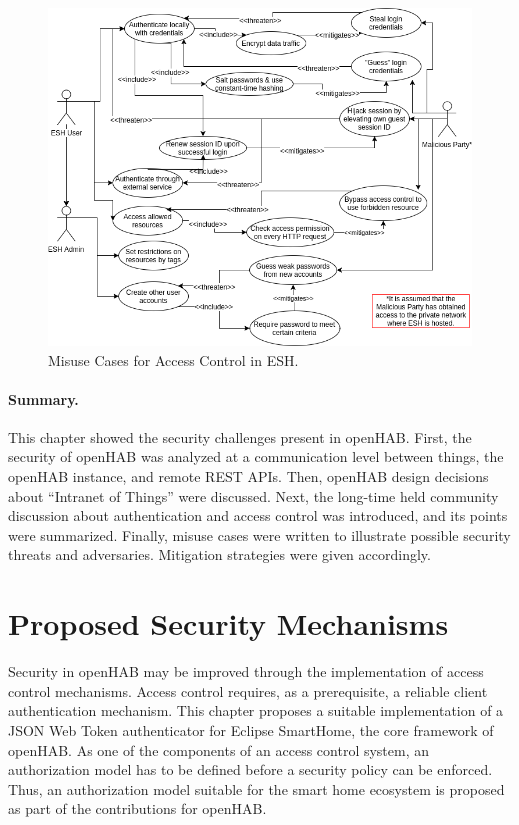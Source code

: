 \documentclass[12pt]{article}
\begin{document}
\begin{figure} [ht] 
\begin{center}
\includegraphics[width=\textwidth]{esh_misuse_cases}
\caption{Misuse Cases for Access Control in ESH.}
\label{fig:misuse_cases}
\end{center}
\end{figure}

\paragraph{Summary.} This chapter showed the security challenges present in openHAB. First, the security of openHAB was analyzed at a communication level between things, the openHAB instance, and remote REST APIs. Then, openHAB design decisions about ``Intranet of Things'' were discussed. Next, the long-time held community discussion about authentication and access control was introduced, and its points were summarized. Finally, misuse cases were written to illustrate possible security threats and adversaries. Mitigation strategies were given accordingly. 

\newpage
\section{Proposed Security Mechanisms}

Security in openHAB may be improved through the implementation of access control mechanisms. Access control requires, as a prerequisite, a reliable client authentication mechanism. This chapter proposes a suitable implementation of a JSON Web Token authenticator for Eclipse SmartHome, the core framework of openHAB. As one of the components of an access control system, an authorization model has to be defined before a security policy can be enforced. Thus, an authorization model suitable for the smart home ecosystem is proposed as part of the contributions for openHAB.
\end{document}

